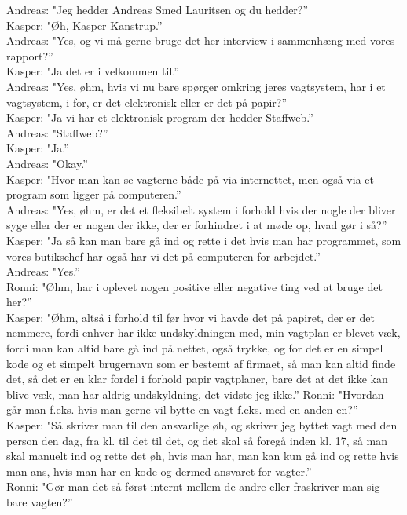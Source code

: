 Andreas: "Jeg hedder Andreas Smed Lauritsen og du hedder?”\\
Kasper: "Øh, Kasper Kanstrup.”\\
Andreas: "Yes, og vi må gerne bruge det her interview i sammenhæng med vores rapport?”\\
Kasper: "Ja det er i velkommen til.”\\
Andreas: "Yes, øhm, hvis vi nu bare spørger omkring jeres vagtsystem, har i et vagtsystem, i for, er det elektronisk eller er det på papir?”\\
Kasper: "Ja vi har et elektronisk program der hedder Staffweb.”\\
Andreas: "Staffweb?”\\
Kasper: "Ja.”\\
Andreas: "Okay.”\\
Kasper: "Hvor man kan se vagterne både på via internettet, men også via et program som ligger på computeren.”\\
Andreas: "Yes, øhm, er det et fleksibelt system i forhold hvis der nogle der bliver syge eller der er nogen der ikke, der er forhindret i at møde op, hvad gør i så?”\\
Kasper: "Ja så kan man bare gå ind og rette i det hvis man har programmet, som vores butikschef har også har vi det på computeren for arbejdet.”\\
Andreas: "Yes.”\\
Ronni: "Øhm, har i oplevet nogen positive eller negative ting ved at bruge det her?”\\
Kasper: "Øhm, altså i forhold til før hvor vi havde det på papiret, der er det nemmere, fordi enhver har ikke undskyldningen med, min vagtplan er blevet væk, fordi man kan altid bare gå ind på nettet, også trykke, og for det er en simpel kode og et simpelt brugernavn som er bestemt af firmaet, så man kan altid finde det, så det er en klar fordel i forhold papir vagtplaner, bare det at det ikke kan blive væk, man har aldrig undskyldning, det vidste jeg ikke.”
Ronni: "Hvordan går man f.eks. hvis man gerne vil bytte en vagt f.eks. med en anden en?”\\
Kasper: "Så skriver man til den ansvarlige øh, og skriver jeg byttet vagt med den person den dag, fra kl. til det til det, og det skal så foregå inden kl. 17, så man skal manuelt ind og rette det øh, hvis man har, man kan kun gå ind og rette hvis man ans, hvis man har en kode og dermed ansvaret for vagter.”\\
Ronni: "Gør man det så først internt mellem de andre eller fraskriver man sig bare vagten?”\\
